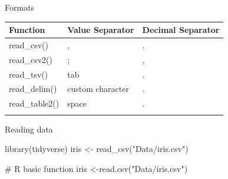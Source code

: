 \documentclass[
  ignorenonframetext,
  aspectratio=169,
]{beamer}
\newenvironment{Shaded}{\begin{snugshade}}{\end{snugshade}}
\newcommand{\CommentTok}[1]{\textcolor[rgb]{0.37,0.37,0.37}{#1}}
\newcommand{\FunctionTok}[1]{\textcolor[rgb]{0.28,0.35,0.67}{#1}}
\newcommand{\NormalTok}[1]{\textcolor[rgb]{0.00,0.23,0.31}{#1}}
\newcommand{\OtherTok}[1]{\textcolor[rgb]{0.00,0.23,0.31}{#1}}
\newcommand{\StringTok}[1]{\textcolor[rgb]{0.13,0.47,0.30}{#1}}
\begin{document}
\begin{frame}{Formats}
\label{formats}
\begin{longtable}[]{@{}lll@{}}
\toprule\noalign{}
Function & Value Separator & Decimal Separator \\
\midrule\noalign{}
\endhead
read\_csv() & , & . \\
read\_csv2() & ; & , \\
read\_tsv() & tab & . \\
read\_delim() & custom character & . \\
read\_table2() & space & . \\
\bottomrule\noalign{}
\end{longtable}
\end{frame}

\begin{frame}[fragile]{Reading data}
\label{reading-data}
\begin{Shaded}
\begin{Highlighting}[numbers=left,,]
\FunctionTok{library}\NormalTok{(tidyverse)}
\NormalTok{iris }\OtherTok{\textless{}{-}} \FunctionTok{read\_csv}\NormalTok{(}\StringTok{"Data/iris.csv"}\NormalTok{)}
\end{Highlighting}
\end{Shaded}

\begin{Shaded}
\begin{Highlighting}[]
\CommentTok{\# R basic function}
\NormalTok{iris }\OtherTok{\textless{}{-}}\FunctionTok{read.csv}\NormalTok{(}\StringTok{"Data/iris.csv"}\NormalTok{)}
\end{Highlighting}
\end{Shaded}
\end{frame}
\end{document}
